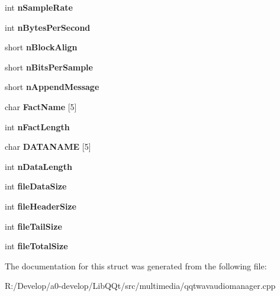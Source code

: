 \begin{DoxyCompactItemize}
int {\bfseries n\+Sample\+Rate}
\item 
\mbox{\label{struct_w_a_v_f_i_l_e_h_e_a_d_e_r_ab738f5f5615c6e4c236fa302712cced3}} 
int {\bfseries n\+Bytes\+Per\+Second}
\item 
\mbox{\label{struct_w_a_v_f_i_l_e_h_e_a_d_e_r_aafc55decfa8135590029333d8bf43e73}} 
short {\bfseries n\+Block\+Align}
\item 
\mbox{\label{struct_w_a_v_f_i_l_e_h_e_a_d_e_r_aa08b9cd863f862504f4bff81b3a4cc46}} 
short {\bfseries n\+Bits\+Per\+Sample}
\item 
\mbox{\label{struct_w_a_v_f_i_l_e_h_e_a_d_e_r_a9a1a375f65808d4663e56806c27fe279}} 
short {\bfseries n\+Append\+Message}
\item 
\mbox{\label{struct_w_a_v_f_i_l_e_h_e_a_d_e_r_ae7469989c787b60b6b7c7721471833dc}} 
char {\bfseries Fact\+Name} \mbox{[}5\mbox{]}
\item 
\mbox{\label{struct_w_a_v_f_i_l_e_h_e_a_d_e_r_a3584c92b25e2eddbf5913a6d241a0a42}} 
int {\bfseries n\+Fact\+Length}
\item 
\mbox{\label{struct_w_a_v_f_i_l_e_h_e_a_d_e_r_a509b069292438566a0e205620cd4672e}} 
char {\bfseries D\+A\+T\+A\+N\+A\+ME} \mbox{[}5\mbox{]}
\item 
\mbox{\label{struct_w_a_v_f_i_l_e_h_e_a_d_e_r_a286f30925fe7f38aeeec45da69ad6eef}} 
int {\bfseries n\+Data\+Length}
\item 
\mbox{\label{struct_w_a_v_f_i_l_e_h_e_a_d_e_r_a0e72b967c2b0136699a93806fec38858}} 
int {\bfseries file\+Data\+Size}
\item 
\mbox{\label{struct_w_a_v_f_i_l_e_h_e_a_d_e_r_a5268b50efb1c52a688644da36ced8b6a}} 
int {\bfseries file\+Header\+Size}
\item 
\mbox{\label{struct_w_a_v_f_i_l_e_h_e_a_d_e_r_a271d7cd46d6a7b57235f2462f8f60beb}} 
int {\bfseries file\+Tail\+Size}
\item 
\mbox{\label{struct_w_a_v_f_i_l_e_h_e_a_d_e_r_a8e74d532600d6fb5fa74459755c0c289}} 
int {\bfseries file\+Total\+Size}
\end{DoxyCompactItemize}


The documentation for this struct was generated from the following file\+:\begin{DoxyCompactItemize}
\item 
R\+:/\+Develop/a0-\/develop/\+Lib\+Q\+Qt/src/multimedia/qqtwavaudiomanager.\+cpp\end{DoxyCompactItemize}
